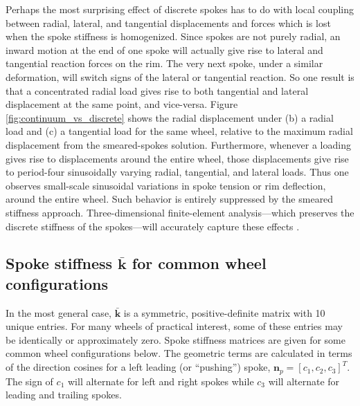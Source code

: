 \documentclass[\rootdir/thesis.tex]{subfiles}
\begin{document}
Perhaps the most surprising effect of discrete spokes has to do with local coupling between radial, lateral, and tangential displacements and forces which is lost when the spoke stiffness is homogenized. Since spokes are not purely radial, an inward motion at the end of one spoke will actually give rise to lateral and tangential reaction forces on the rim. The very next spoke, under a similar deformation, will switch signs of the lateral or tangential reaction. So one result is that a concentrated radial load gives rise to both tangential and lateral displacement at the same point, and vice-versa. Figure \ref{fig:continuum_vs_discrete} shows the radial displacement under (b) a radial load and (c) a tangential load for the same wheel, relative to the maximum radial displacement from the smeared-spokes solution. Furthermore, whenever a loading gives rise to displacements around the entire wheel, those displacements give rise to period-four sinusoidally varying radial, tangential, and lateral loads. Thus one observes small-scale sinusoidal variations in spoke tension or rim deflection, around the entire wheel. Such behavior is entirely suppressed by the smeared stiffness approach. Three-dimensional finite-element analysis---which preserves the discrete stiffness of the spokes---will accurately capture these effects \cite{Salamon1992}.

\subsection{Spoke stiffness $\bar{\mathbf{k}}$ for common wheel configurations}

In the most general case, $\bar{\mathbf{k}}$ is a symmetric, positive-definite matrix with 10 unique entries. For many wheels of practical interest, some of these entries may be identically or approximately zero. Spoke stiffness matrices are given for some common wheel configurations below. The geometric terms are calculated in terms of the direction cosines for a left leading (or ``pushing'') spoke, $\mathbf{n}_p = [c_1, c_2, c_3]^T$. The sign of $c_1$ will alternate for left and right spokes while $c_3$ will alternate for leading and trailing spokes.
\end{document}
